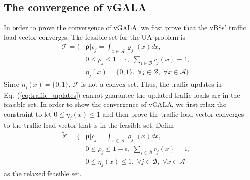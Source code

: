 \documentclass[journal]{IEEEtran}
\theoremstyle{definition}
\begin{document}
\subsection{The convergence of vGALA}
\label{subsec:convergence}
In order to prove the convergence of vGALA, we first prove that the vBSs' traffic load vector converges. The feasible set for the UA problem is
\begin{align}
\label{eq:feasible_set}
\mathcal{F}=\lbrace &\boldsymbol{\rho}|\rho_{j}=\int_{x \in \mathcal{A}}\varrho_{j}(x)dx,\nonumber \\
&0\leq\rho_{j}\leq 1-\epsilon,\; \sum_{j\in\mathcal{B}}\eta_{j}(x)=1,\nonumber \\
& \eta_{j}(x)=\{0,1\},\;\forall j\in\mathcal{B},\;\forall x \in\mathcal{A}\rbrace
\end{align}
Since $\eta_{j}(x)=\{0,1\}$, $\mathcal{F}$ is not a convex set. Thus, the traffic updates in Eq.~(\ref{eq:traffic_updates}) cannot guarantee the updated traffic loads are in the feasible set. In order to show the convergence of vGALA, we first relax the constraint to let $0\leq\eta_{j}(x)\leq 1$ and then prove the traffic load vector converges to the traffic load vector that is in the feasible set. Define
\begin{align}
\mathcal{\tilde{F}}=\lbrace &\boldsymbol{\rho}|\rho_{j}=\int_{x \in \mathcal{A}}\varrho_{j}(x)dx,\nonumber\\
&0\leq\rho_{j}\leq 1-\epsilon,\; \sum_{j\in\mathcal{B}}\eta_{j}(x)=1,\nonumber\\
& 0\leq \eta_{j}(x)\leq 1,\;\forall j\in\mathcal{B},\;\forall x \in\mathcal{A}\rbrace
\end{align}
as the relaxed feasible set.
\end{document}
